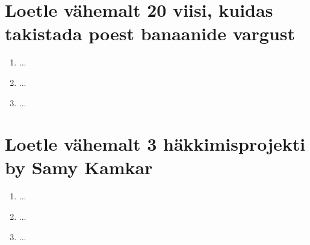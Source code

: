 \documentclass{article}
\begin{document}
\section{Loetle vähemalt 20 viisi, kuidas takistada poest banaanide vargust}
\begin{enumerate}
	\item{...}
	\item{...}
	\item{...}
\end{enumerate}

\section{Loetle vähemalt 3 häkkimisprojekti by Samy Kamkar}
\begin{enumerate}
	\item{...}
	\item{...}
	\item{...}
\end{enumerate}
\end{document}
